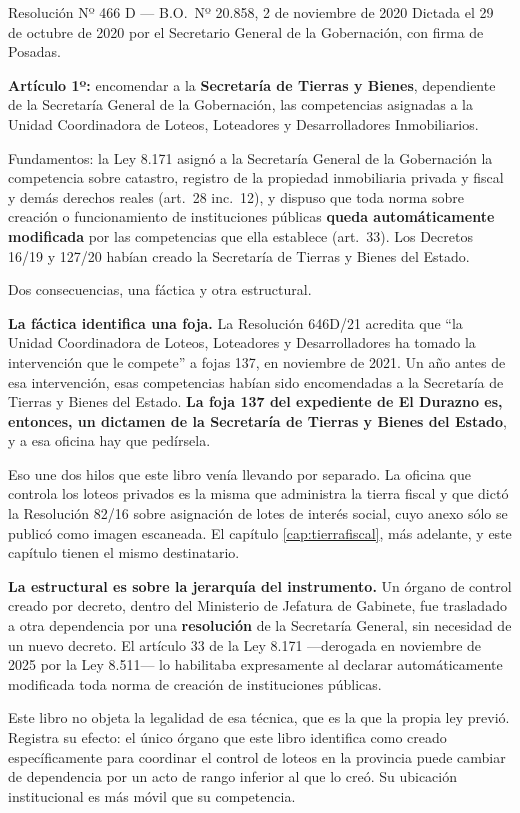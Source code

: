 \begin{ficha}{Resolución Nº 466 D --- B.O.\ Nº 20.858, 2 de noviembre de 2020}
Dictada el 29 de octubre de 2020 por el Secretario General de la Gobernación, con firma de Posadas.

\textbf{Artículo 1º:} encomendar a la \textbf{Secretaría de Tierras y Bienes}, dependiente de la Secretaría General de la Gobernación, las competencias asignadas a la Unidad Coordinadora de Loteos, Loteadores y Desarrolladores Inmobiliarios.

Fundamentos: la Ley 8.171 asignó a la Secretaría General de la Gobernación la competencia sobre catastro, registro de la propiedad inmobiliaria privada y fiscal y demás derechos reales (art.\ 28 inc.\ 12), y dispuso que toda norma sobre creación o funcionamiento de instituciones públicas \textbf{queda automáticamente modificada} por las competencias que ella establece (art.\ 33). Los Decretos 16/19 y 127/20 habían creado la Secretaría de Tierras y Bienes del Estado.
\end{ficha}

\begin{cautela}
Dos consecuencias, una fáctica y otra estructural.

\textbf{La fáctica identifica una foja.} La Resolución 646D/21 acredita que ``la Unidad Coordinadora de Loteos, Loteadores y Desarrolladores ha tomado la intervención que le compete'' a fojas 137, en noviembre de 2021. Un año antes de esa intervención, esas competencias habían sido encomendadas a la Secretaría de Tierras y Bienes del Estado. \textbf{La foja 137 del expediente de El Durazno es, entonces, un dictamen de la Secretaría de Tierras y Bienes del Estado}, y a esa oficina hay que pedírsela.

Eso une dos hilos que este libro venía llevando por separado. La oficina que controla los loteos privados es la misma que administra la tierra fiscal y que dictó la Resolución 82/16 sobre asignación de lotes de interés social, cuyo anexo sólo se publicó como imagen escaneada. El capítulo \ref{cap:tierrafiscal}, más adelante, y este capítulo tienen el mismo destinatario.

\textbf{La estructural es sobre la jerarquía del instrumento.} Un órgano de control creado por decreto, dentro del Ministerio de Jefatura de Gabinete, fue trasladado a otra dependencia por una \textbf{resolución} de la Secretaría General, sin necesidad de un nuevo decreto. El artículo 33 de la Ley 8.171 ---derogada en noviembre de 2025 por la Ley 8.511--- lo habilitaba expresamente al declarar automáticamente modificada toda norma de creación de instituciones públicas.

Este libro no objeta la legalidad de esa técnica, que es la que la propia ley previó. Registra su efecto: el único órgano que este libro identifica como creado específicamente para coordinar el control de loteos en la provincia puede cambiar de dependencia por un acto de rango inferior al que lo creó. Su ubicación institucional es más móvil que su competencia.
\end{cautela}

